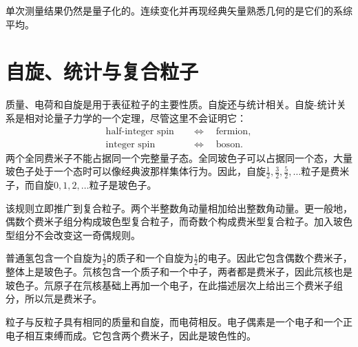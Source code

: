 单次测量结果仍然是量子化的。连续变化并再现经典矢量熟悉几何的是它们的系综平均。

\section{自旋、统计与复合粒子}

质量、电荷和自旋是用于表征粒子的主要性质。自旋还与统计相关。自旋-统计关系是相对论量子力学的一个定理，尽管这里不会证明它：
\begin{equation}
\begin{aligned}
\text{half-integer spin} &\quad\Longleftrightarrow\quad \text{fermion},\\
\text{integer spin} &\quad\Longleftrightarrow\quad \text{boson}.
\end{aligned}
\end{equation}
两个全同费米子不能占据同一个完整量子态。全同玻色子可以占据同一个态，大量玻色子处于一个态时可以像经典波那样集体行为。因此，自旋\(\tfrac12,\tfrac32,\tfrac52,\ldots\)粒子是费米子，而自旋\(0,1,2,\ldots\)粒子是玻色子。

该规则立即推广到复合粒子。两个半整数角动量相加给出整数角动量。更一般地，偶数个费米子组分构成玻色型复合粒子，而奇数个构成费米型复合粒子。加入玻色型组分不会改变这一奇偶规则。

普通氢包含一个自旋为\(\tfrac12\)的质子和一个自旋为\(\tfrac12\)的电子。因此它包含偶数个费米子，整体上是玻色子。氘核包含一个质子和一个中子，两者都是费米子，因此氘核也是玻色子。氘原子在氘核基础上再加一个电子，在此描述层次上给出三个费米子组分，所以氘是费米子。

粒子与反粒子具有相同的质量和自旋，而电荷相反。电子偶素是一个电子和一个正电子相互束缚而成。它包含两个费米子，因此是玻色性的。

\begin{classroomqa}
\end{classroomqa}

